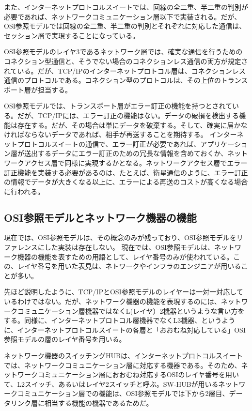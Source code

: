 また、インターネットプロトコルスイートでは、回線の全二重、半二重の判別が必要であれば、ネットワークコミュニケーション層以下で実装される。だが、OSI参照モデルでは回線の全二重、半二重の判別とそれぞれに対応した通信は、セッション層で実現することになっている。

OSI参照モデルのレイヤ3であるネットワーク層では、確実な通信を行うためのコネクション型通信と、そうでない場合のコネクションレス通信の両方が規定されている。だが、TCP/IPのインターネットプロトコル層は、コネクションレス通信のプロトコルである。コネクション型のプロトコルは、その上位のトランスポート層が担当する。

OSI参照モデルでは、トランスポート層がエラー訂正の機能を持つとされている。だが、TCP/IPには、エラー訂正の機能はない。データの破損を検出する機能は存在する。だが、その場合は単にデータを破棄する。そして、確実に届かなければならないデータであれば、相手が再送することを期待する。
インターネットプロトコルスイートの通信で、エラー訂正が必要であれば、アプリケーション層が送出するデータにエラー訂正のための冗長な情報を含めておくか、ネットワークアクセス層で同様に実現するかとなる。ネットワークアクセス層でエラー訂正機能を実装する必要があるのは、たとえば、衛星通信のように、エラー訂正の情報でデータが大きくなる以上に、エラーによる再送のコストが高くなる場合に行われる。


\subsection{OSI参照モデルとネットワーク機器の機能}
現在では、OSI参照モデルは、その概念のみが残っており、OSI参照モデルをリファレンスにした実装は存在しない。
現在では、OSI参照モデルは、ネットワーク機器の機能を表すための用語として、レイヤ番号のみが使われている。この、レイヤ番号を用いた表見は、ネトワークやインフラのエンジニアが用いることが多い。

先ほど説明したように、TCP/IPとOSI参照モデルのレイヤーは一対一対応しているわけではない。だが、ネットワーク機器の機能を表現するのには、ネットワークコミュニケーション層機器ではなくL(レイヤ）2機器というような言い方をする。同様に、インターネットプロトコル層機器でなくL3機器、というように、インターネットプロトコルスイートの各層と「おおむね対応している」OSI参照モデルの層のレイヤ番号を用いる。

ネットワーク機器のスイッチングHUBは、インターネットプロトコルスイートでは、ネットワークコミュニケーション層に対応する機器である。そのため、ネットワークコミュニケーション層におおむね対応するOSIのレイヤ番号を用いて、L2スイッチ、あるいはレイヤ2スイッチと呼ぶ。SW-HUBが用いるネットワークコミュニケーション層での機能は、OSI参照モデルでは下から2層目、データリンク層に相当する機能の機器であるためだ。

